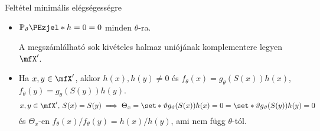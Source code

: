 \documentclass[aspectratio=169,notheorems,9pt,\option]{beamer}
\begin{document}
\begin{frame}{Feltétel minimális elégségességre}
\begin{itemize}
    \item $\P[\theta]{h=0}=0$  minden $\theta$-ra.
    
    A megszámlálható sok kivételes halmaz uniójának komplementere legyen $\mfX'$.
    
    \item Ha $x,y\in\mfX'$, akkor $h(x),h(y)\neq0$ és $f_{\theta}(x)=g_\theta(S(x))h(x)$, $f_{\theta}(y)=g_\theta(S(y))h(y)$.
    \begin{displaymath}
      x,y\in\mfX',\,S(x)=S(y)\implies 
      \Theta_{x}=\set*{\theta}{%
        g_\theta(S(x))h(x)=0}
      =\set*{\theta}{%
        g_\theta(S(y))h(y)=0}
    \end{displaymath} 
    és $\Theta_x$-en
    $f_\theta(x)/f_\theta(y)=h(x)/h(y)$, ami nem függ $\theta$-tól.
  \end{itemize}
\end{frame}
\end{document}
